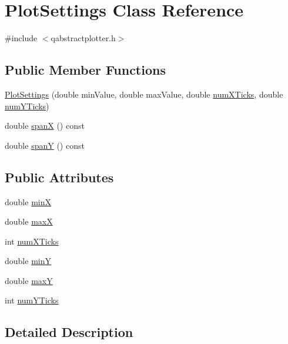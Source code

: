 \hypertarget{class_plot_settings}{}\section{Plot\+Settings Class Reference}
\label{class_plot_settings}


{\ttfamily \#include $<$qabstractplotter.\+h$>$}

\subsection*{Public Member Functions}
\begin{DoxyCompactItemize}
\item 
\hyperlink{class_plot_settings_a58c0896d3622f6e224bb108e8b9fd1d2}{Plot\+Settings} (double min\+Value, double max\+Value, double \hyperlink{class_plot_settings_a6cb8aae67d8e1fc60ccb61f50b37bf0c}{num\+X\+Ticks}, double \hyperlink{class_plot_settings_a8951d83f460971da1fa7d582a510e19c}{num\+Y\+Ticks})
\item 
double \hyperlink{class_plot_settings_ad2d73a5c02b00c4676cfd4b79f3477a5}{span\+X} () const 
\item 
double \hyperlink{class_plot_settings_a346be9b63b807112c7b7247d717fec32}{span\+Y} () const 
\end{DoxyCompactItemize}
\subsection*{Public Attributes}
\begin{DoxyCompactItemize}
\item 
double \hyperlink{class_plot_settings_a0f3c3bfbc9387ca63259b8316488530e}{min\+X}
\item 
double \hyperlink{class_plot_settings_a14fb707bc407b135c8733bf26a78fe98}{max\+X}
\item 
int \hyperlink{class_plot_settings_a6cb8aae67d8e1fc60ccb61f50b37bf0c}{num\+X\+Ticks}
\item 
double \hyperlink{class_plot_settings_ad3cc5104ce9c973747a166f940f73962}{min\+Y}
\item 
double \hyperlink{class_plot_settings_a79c0bea58aa61bffe86d2b282d1ce7dd}{max\+Y}
\item 
int \hyperlink{class_plot_settings_a8951d83f460971da1fa7d582a510e19c}{num\+Y\+Ticks}
\end{DoxyCompactItemize}


\subsection{Detailed Description}


